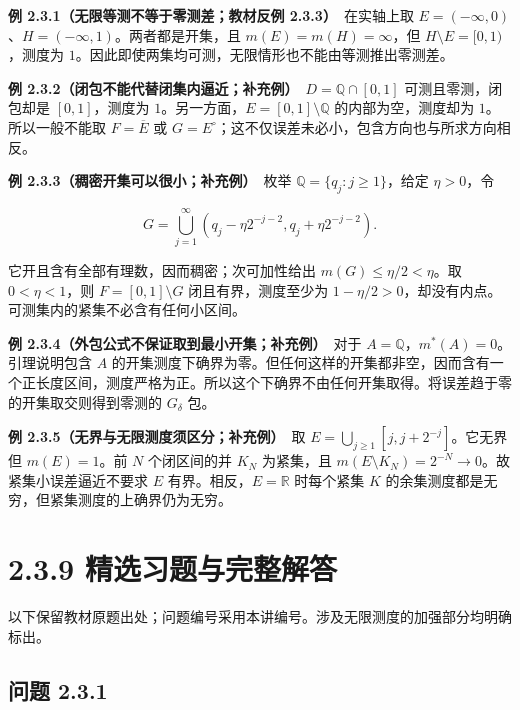 \documentclass[11pt,a4paper]{article}
\begin{document}
\textbf{例 2.3.1（无限等测不等于零测差；教材反例 2.3.3）}　在实轴上取
\(E=(-\infty,0)\)、\(H=(-\infty,1)\)。两者都是开集，且
\(m(E)=m(H)=\infty\)，但 \(H\setminus E=[0,1)\)，测度为
\(1\)。因此即使两集均可测，无限情形也不能由等测推出零测差。

\textbf{例
2.3.2（闭包不能代替闭集内逼近；补充例）}　\(D=\mathbb Q\cap[0,1]\)
可测且零测，闭包却是 \([0,1]\)，测度为
\(1\)。另一方面，\(E=[0,1]\setminus\mathbb Q\) 的内部为空，测度却为
\(1\)。所以一般不能取 \(F=\overline E\) 或
\(G=E^\circ\)；这不仅误差未必小，包含方向也与所求方向相反。

\textbf{例 2.3.3（稠密开集可以很小；补充例）}　枚举
\(\mathbb Q=\{q_j:j\ge1\}\)，给定 \(\eta>0\)，令

\begin{equation*}
G=\bigcup_{j=1}^{\infty}
(q_j-\eta2^{-j-2},q_j+\eta2^{-j-2}).
\tag{2.3.15}
\end{equation*}

它开且含有全部有理数，因而稠密；次可加性给出 \(m(G)\le\eta/2<\eta\)。取
\(0<\eta<1\)，则 \(F=[0,1]\setminus G\) 闭且有界，测度至少为
\(1-\eta/2>0\)，却没有内点。可测集内的紧集不必含有任何小区间。

\textbf{例 2.3.4（外包公式不保证取到最小开集；补充例）}　对于
\(A=\mathbb Q\)，\(m^*(A)=0\)。引理说明包含 \(A\)
的开集测度下确界为零。但任何这样的开集都非空，因而含有一个正长度区间，测度严格为正。所以这个下确界不由任何开集取得。将误差趋于零的开集取交则得到零测的
\(G_\delta\) 包。

\textbf{例 2.3.5（无界与无限测度须区分；补充例）}　取
\(E=\bigcup_{j\ge1}[j,j+2^{-j}]\)。它无界但 \(m(E)=1\)。前 \(N\)
个闭区间的并 \(K_N\) 为紧集，且
\(m(E\setminus K_N)=2^{-N}\to0\)。故紧集小误差逼近不要求 \(E\)
有界。相反，\(E=\mathbb R\) 时每个紧集 \(K\)
的余集测度都是无穷，但紧集测度的上确界仍为无穷。

\section[\S{}2.3.9
精选习题与完整解答]{2.3.9
精选习题与完整解答}\label{ux7cbeux9009ux4e60ux9898ux4e0eux5b8cux6574ux89e3ux7b54}

以下保留教材原题出处；问题编号采用本讲编号。涉及无限测度的加强部分均明确标出。

\subsection{问题 2.3.1}\label{ux95eeux9898-2.3.1}
\end{document}
